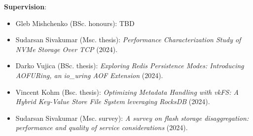 \documentclass[letterpaper,11pt]{article}
\begin{document}
\textbf{Supervision}:
\begin{itemize}
\itemsep0em
  \item Gleb Mishchenko  (BSc. honours):  TBD
  
  \item Sudarsan Sivakumar (Msc. thesis): 
  \textit{Performance Characterization Study of NVMe Storage Over TCP} (2024).
  
  \item Darko Vujica (BSc. thesis): 
  \textit{Exploring Redis Persistence Modes: Introducing AOFURing, an io\_uring AOF Extension} (2024).
  
  \item Vincent Kohm (Bsc. thesis): 
  \textit{Optimizing Metadata Handling with vkFS: A Hybrid Key-Value Store File System leveraging RocksDB} (2024).
  
  \item Sudarsan Sivakumar (Msc. survey): 
  \textit{A survey on flash storage disaggregation: performance and quality of service considerations} (2024).
\end{itemize}

%


\end{document}
